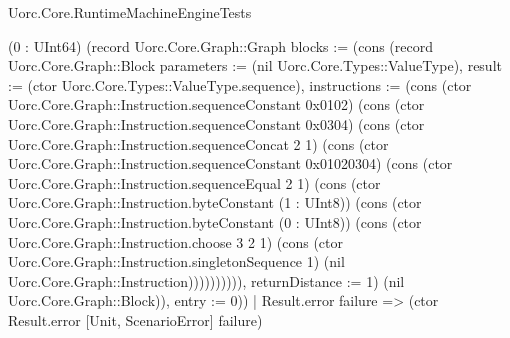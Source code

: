 \begin{lexlean}{Uorc.Core.RuntimeMachineEngineTests}
\begin{semanticmodule}
{(0 : UInt64) (record Uorc.Core.Graph::Graph {blocks := (cons (record Uorc.Core.Graph::Block {parameters := (nil Uorc.Core.Types::ValueType), result := (ctor Uorc.Core.Types::ValueType.sequence), instructions := (cons (ctor Uorc.Core.Graph::Instruction.sequenceConstant 0x0102) (cons (ctor Uorc.Core.Graph::Instruction.sequenceConstant 0x0304) (cons (ctor Uorc.Core.Graph::Instruction.sequenceConcat 2 1) (cons (ctor Uorc.Core.Graph::Instruction.sequenceConstant 0x01020304) (cons (ctor Uorc.Core.Graph::Instruction.sequenceEqual 2 1) (cons (ctor Uorc.Core.Graph::Instruction.byteConstant (1 : UInt8)) (cons (ctor Uorc.Core.Graph::Instruction.byteConstant (0 : UInt8)) (cons (ctor Uorc.Core.Graph::Instruction.choose 3 2 1) (cons (ctor Uorc.Core.Graph::Instruction.singletonSequence 1) (nil Uorc.Core.Graph::Instruction)))))))))), returnDistance := 1}) (nil Uorc.Core.Graph::Block)), entry := 0}))
    | Result.error failure => (ctor Result.error [Unit, ScenarioError] failure)
}
\end{semanticmodule}
\end{lexlean}
